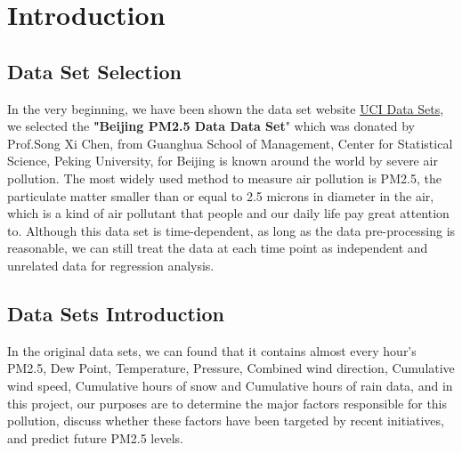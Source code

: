 
\chapter{Introduction} %

\label{Chapter1} %


\newcommand{\keyword}[1]{\textbf{#1}}
\newcommand{\tabhead}[1]{\textbf{#1}}
\newcommand{\code}[1]{\texttt{#1}}
\newcommand{\file}[1]{\texttt{\bfseries#1}}
\newcommand{\option}[1]{\texttt{\itshape#1}}

\section{Data Set Selection} %

In the very beginning, we have been shown the data set website \href{https://archive.ics.uci.edu/ml/datasets.html}{UCI Data Sets}, we selected the \textbf{"Beijing PM2.5 Data Data Set}" which was donated by Prof.Song Xi Chen, from Guanghua School of Management, Center for Statistical Science, Peking University\citep{liang2015assessing}, for Beijing is known around the world by severe air pollution. The most widely used method to measure air pollution is PM2.5, the particulate matter smaller than or equal to 2.5 microns in diameter in the air, which is a kind of air pollutant that people and our daily life pay great attention to. Although this data set is time-dependent, as long as the data pre-processing is reasonable, we can still treat the data at each time point as independent and unrelated data for regression analysis.





\section{Data Sets Introduction} %

In the original data sets, we can found that it contains almost every hour's PM2.5, Dew Point, Temperature, Pressure, Combined wind direction, Cumulative wind speed, Cumulative hours of snow and  Cumulative hours of rain data, and in this project, our purposes are to determine the major factors responsible for this pollution, discuss whether these factors have been targeted by recent initiatives, and predict future PM2.5 levels.

